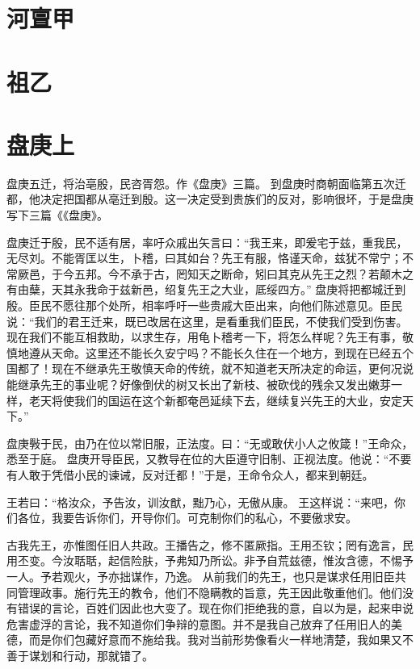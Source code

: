 \documentclass[a4paper,12pt,UTF8,twoside]{ctexbook}
\begin{document}
\chapter{河亶甲}
\chapter{祖乙}
\chapter{盘庚上}

盘庚五迁，将治亳殷，民咨胥怨。作《盘庚》三篇。
到盘庚时商朝面临第五次迁都，他决定把国都从亳迁到殷。这一决定受到贵族们的反对，影响很坏，于是盘庚写下三篇《《盘庚》。

盘庚迁于殷，民不适有居，率吁众戚出矢言曰：“我王来，即爰宅于兹，重我民，无尽刘。不能胥匡以生，卜稽，曰其如台？先王有服，恪谨天命，兹犹不常宁；不常厥邑，于今五邦。今不承于古，罔知天之断命，矧曰其克从先王之烈？若颠木之有由蘖，天其永我命于兹新邑，绍复先王之大业，厎绥四方。”
盘庚将把都城迁到殷。臣民不愿往那个处所，相率呼吁一些贵戚大臣出来，向他们陈述意见。臣民说：“我们的君王迁来，既已改居在这里，是看重我们臣民，不使我们受到伤害。现在我们不能互相救助，以求生存，用龟卜稽考一下，将怎么样呢？先王有事，敬慎地遵从天命。这里还不能长久安宁吗？不能长久住在一个地方，到现在已经五个国都了！现在不继承先王敬慎天命的传统，就不知道老天所决定的命运，更何况说能继承先王的事业呢？好像倒伏的树又长出了新枝、被砍伐的残余又发出嫩芽一样，老天将使我们的国运在这个新都奄邑延续下去，继续复兴先王的大业，安定天下。”

盘庚斅于民，由乃在位以常旧服，正法度。曰：“无或敢伏小人之攸箴！”王命众，悉至于庭。
盘庚开导臣民，又教导在位的大臣遵守旧制、正视法度。他说：“不要有人敢于凭借小民的谏诫，反对迁都！”于是，王命令众人，都来到朝廷。

王若曰：“格汝众，予告汝，训汝猷，黜乃心，无傲从康。
王这样说：“来吧，你们各位，我要告诉你们，开导你们。可克制你们的私心，不要傲求安。

古我先王，亦惟图任旧人共政。王播告之，修不匿厥指。王用丕钦；罔有逸言，民用丕变。今汝聒聒，起信险肤，予弗知乃所讼。非予自荒兹德，惟汝含德，不惕予一人。予若观火，予亦拙谋作，乃逸。
从前我们的先王，也只是谋求任用旧臣共同管理政事。施行先王的教令，他们不隐瞒教的旨意，先王因此敬重他们。他们没有错误的言论，百姓们因此也大变了。现在你们拒绝我的意，自以为是，起来申说危害虚浮的言论，我不知道你们争辩的意图。并不是我自己放弃了任用旧人的美德，而是你们包藏好意而不施给我。我对当前形势像看火一样地清楚，我如果又不善于谋划和行动，那就错了。
\end{document}

